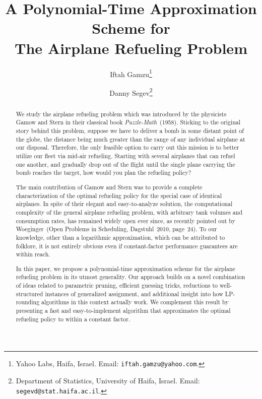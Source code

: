 \documentclass[11pt]{article}
\theoremstyle{plain}
\theoremstyle{definition}
\begin{document}
\begin{titlepage}
\title{A Polynomial-Time Approximation Scheme for \\
The Airplane Refueling Problem}
\author{
Iftah Gamzu\thanks{Yahoo Labs, Haifa, Israel. Email: {\tt iftah.gamzu@yahoo.com}.}\and Danny Segev\thanks{Department of Statistics, University of Haifa, Israel. Email: {\tt segevd@stat.haifa.ac.il}.}}\date{}
\maketitle


\begin{abstract}
We study the airplane refueling problem which was introduced by the physicists Gamow and Stern in their classical book {\em Puzzle-Math}~(1958). Sticking to the original story behind this problem, suppose we have to deliver a bomb in some distant point of the globe, the distance being much greater than the range of any individual airplane at our disposal. Therefore, the only feasible option to carry out this mission is to better utilize our fleet via mid-air refueling. Starting with several airplanes that can refuel one another, and gradually drop out of the flight until the single plane carrying the bomb reaches the target, how would you plan the refueling policy?

The main contribution of Gamow and Stern was to provide a complete characterization of the optimal refueling policy for the special case of identical airplanes. In spite of their elegant and easy-to-analyze solution, the computational complexity of the general airplane refueling problem, with arbitrary tank volumes and consumption rates, has remained widely open ever since, as recently pointed out by Woeginger~(Open Problems in Scheduling, Dagstuhl~2010, page~24). To our knowledge, other than a logarithmic approximation, which can be attributed to folklore, it is not entirely obvious even if constant-factor performance guarantees are within reach.

In this paper, we propose a polynomial-time approximation scheme for the airplane refueling problem in its utmost generality. Our approach builds on a novel combination of ideas related to parametric pruning, efficient guessing tricks, reductions to well-structured instances of generalized assignment, and additional insight into how LP-rounding algorithms in this context actually work. We complement this result by presenting a fast and easy-to-implement algorithm that approximates the optimal refueling policy to within a constant factor.
\end{abstract}

\thispagestyle{empty}
\end{titlepage}
\end{document}
